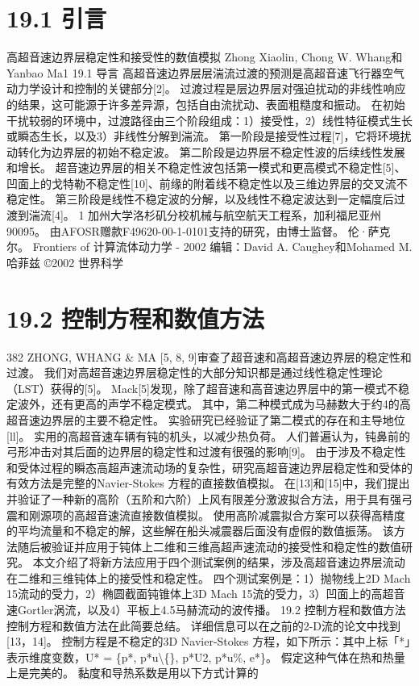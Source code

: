 \documentclass[UTF8,11pt,a4paper,openany,fontset=fandol]{ctexbook}
\begin{document}
\section{19.1 引言}
高超音速边界层稳定性和接受性的数值模拟 Zhong Xiaolin, Chong W. Whang和Yanbao Ma1 19.1 导言 高超音速边界层层湍流过渡的预测是高超音速飞行器空气动力学设计和控制的关键部分[2]。 过渡过程是层边界层对强迫扰动的非线性响应的结果，这可能源于许多差异源，包括自由流扰动、表面粗糙度和振动。 在初始干扰较弱的环境中，过渡路径由三个阶段组成：1）接受性，2）线性特征模式生长或瞬态生长，以及3）非线性分解到湍流。 第一阶段是接受性过程[7]，它将环境扰动转化为边界层的初始不稳定波。 第二阶段是边界层不稳定性波的后续线性发展和增长。 超音速边界层的相关不稳定性波包括第一模式和更高模式不稳定性[5]、凹面上的戈特勒不稳定性[10]、前缘的附着线不稳定性以及三维边界层的交叉流不稳定性。 第三阶段是线性不稳定波的分解，以及线性不稳定波达到一定幅度后过渡到湍流[4]。 1 加州大学洛杉矶分校机械与航空航天工程系，加利福尼亚州90095。 由AFOSR赠款F49620-00-1-0101支持的研究，由博士监督。 伦·萨克尔。 Frontiers of 计算流体动力学 - 2002 编辑：David A. Caughey和Mohamed M. 哈菲兹 ©2002 世界科学

\section{19.2 控制方程和数值方法}
382 ZHONG, WHANG \& MA [5, 8, 9]审查了超音速和高超音速边界层的稳定性和过渡。 我们对高超音速边界层稳定性的大部分知识都是通过线性稳定性理论（LST）获得的[5]。 Mack[5]发现，除了超音速和高音速边界层中的第一模式不稳定波外，还有更高的声学不稳定模式。 其中，第二种模式成为马赫数大于约4的高超音速边界层的主要不稳定性。 实验研究已经验证了第二模式的存在和主导地位[ll]。 实用的高超音速车辆有钝的机头，以减少热负荷。 人们普遍认为，钝鼻前的弓形冲击对其后面的边界层的稳定性和过渡有很强的影响[9]。 由于涉及不稳定性和受体过程的瞬态高超声速流动场的复杂性，研究高超音速边界层稳定性和受体的有效方法是完整的Navier-Stokes 方程的直接数值模拟。 在[13]和[15]中，我们提出并验证了一种新的高阶（五阶和六阶）上风有限差分激波拟合方法，用于具有强弓震和刚源项的高超音速流直接数值模拟。 使用高阶减震拟合方案可以获得高精度的平均流量和不稳定的解，这些解在船头减震器后面没有虚假的数值振荡。 该方法随后被验证并应用于钝体上二维和三维高超声速流动的接受性和稳定性的数值研究。 本文介绍了将新方法应用于四个测试案例的结果，涉及高超音速边界层流动在二维和三维钝体上的接受性和稳定性。 四个测试案例是：1）抛物线上2D Mach 15流动的受力，2）椭圆截面钝锥体上3D Mach 15流的受力，3）凹面上的高超音速Gortler涡流，以及4）平板上4.5马赫流动的波传播。 19.2 控制方程和数值方法 控制方程和数值方法在此简要总结。 详细信息可以在之前的2-D流的论文中找到[13，14]。 控制方程是不稳定的3D Navier-Stokes 方程，如下所示：其中上标「*」表示维度变数，U* = \{p*, p*u\textbackslash\{\}, p*U2, p*u\%, e*\}。 假定这种气体在热和热量上是完美的。 黏度和导热系数是用以下方式计算的
\end{document}
